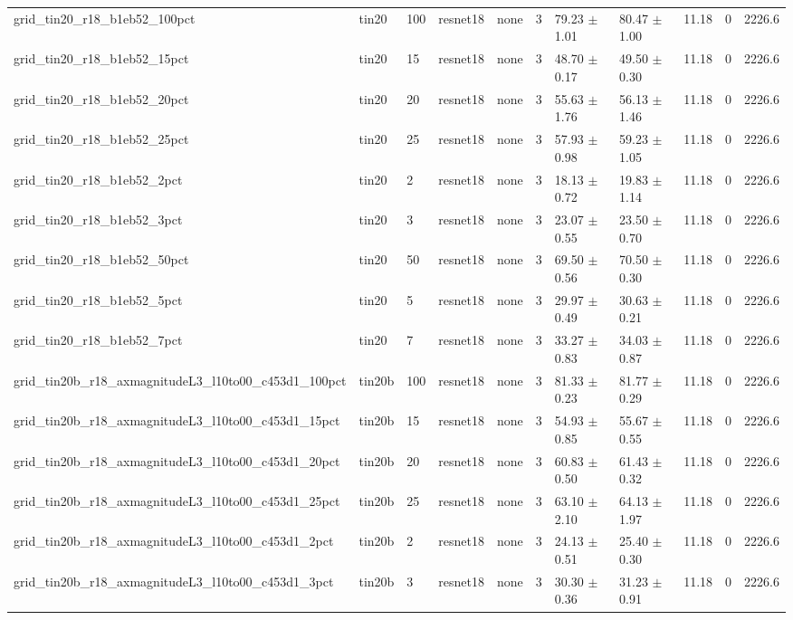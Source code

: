 \begin{tabular}{lllllllllll}
grid_tin20_r18_b1eb52_100pct & tin20 & 100 & resnet18 & none & 3 & 79.23 $\pm$ 1.01 & 80.47 $\pm$ 1.00 & 11.18 & 0 & 2226.6 \\
grid_tin20_r18_b1eb52_15pct & tin20 & 15 & resnet18 & none & 3 & 48.70 $\pm$ 0.17 & 49.50 $\pm$ 0.30 & 11.18 & 0 & 2226.6 \\
grid_tin20_r18_b1eb52_20pct & tin20 & 20 & resnet18 & none & 3 & 55.63 $\pm$ 1.76 & 56.13 $\pm$ 1.46 & 11.18 & 0 & 2226.6 \\
grid_tin20_r18_b1eb52_25pct & tin20 & 25 & resnet18 & none & 3 & 57.93 $\pm$ 0.98 & 59.23 $\pm$ 1.05 & 11.18 & 0 & 2226.6 \\
grid_tin20_r18_b1eb52_2pct & tin20 & 2 & resnet18 & none & 3 & 18.13 $\pm$ 0.72 & 19.83 $\pm$ 1.14 & 11.18 & 0 & 2226.6 \\
grid_tin20_r18_b1eb52_3pct & tin20 & 3 & resnet18 & none & 3 & 23.07 $\pm$ 0.55 & 23.50 $\pm$ 0.70 & 11.18 & 0 & 2226.6 \\
grid_tin20_r18_b1eb52_50pct & tin20 & 50 & resnet18 & none & 3 & 69.50 $\pm$ 0.56 & 70.50 $\pm$ 0.30 & 11.18 & 0 & 2226.6 \\
grid_tin20_r18_b1eb52_5pct & tin20 & 5 & resnet18 & none & 3 & 29.97 $\pm$ 0.49 & 30.63 $\pm$ 0.21 & 11.18 & 0 & 2226.6 \\
grid_tin20_r18_b1eb52_7pct & tin20 & 7 & resnet18 & none & 3 & 33.27 $\pm$ 0.83 & 34.03 $\pm$ 0.87 & 11.18 & 0 & 2226.6 \\
grid_tin20b_r18_axmagnitudeL3_l10to00_c453d1_100pct & tin20b & 100 & resnet18 & none & 3 & 81.33 $\pm$ 0.23 & 81.77 $\pm$ 0.29 & 11.18 & 0 & 2226.6 \\
grid_tin20b_r18_axmagnitudeL3_l10to00_c453d1_15pct & tin20b & 15 & resnet18 & none & 3 & 54.93 $\pm$ 0.85 & 55.67 $\pm$ 0.55 & 11.18 & 0 & 2226.6 \\
grid_tin20b_r18_axmagnitudeL3_l10to00_c453d1_20pct & tin20b & 20 & resnet18 & none & 3 & 60.83 $\pm$ 0.50 & 61.43 $\pm$ 0.32 & 11.18 & 0 & 2226.6 \\
grid_tin20b_r18_axmagnitudeL3_l10to00_c453d1_25pct & tin20b & 25 & resnet18 & none & 3 & 63.10 $\pm$ 2.10 & 64.13 $\pm$ 1.97 & 11.18 & 0 & 2226.6 \\
grid_tin20b_r18_axmagnitudeL3_l10to00_c453d1_2pct & tin20b & 2 & resnet18 & none & 3 & 24.13 $\pm$ 0.51 & 25.40 $\pm$ 0.30 & 11.18 & 0 & 2226.6 \\
grid_tin20b_r18_axmagnitudeL3_l10to00_c453d1_3pct & tin20b & 3 & resnet18 & none & 3 & 30.30 $\pm$ 0.36 & 31.23 $\pm$ 0.91 & 11.18 & 0 & 2226.6 \\

\end{tabular}
